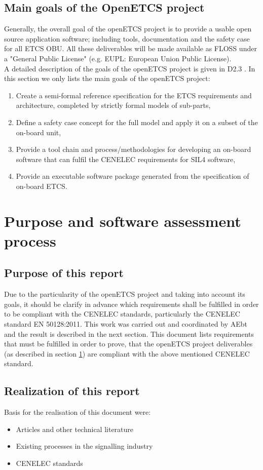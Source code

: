 \documentclass{template/openetcs_report}
\begin{document}
\section{Main goals of the OpenETCS project}
\label{goals}
Generally, the overall goal of the openETCS project is to provide a usable open source application software; including tools, documentation and the safety case for all ETCS OBU. All these deliverables will be made available as FLOSS under a "General Public License" (e.g. EUPL: European Union Public License).
\\
A detailed description of the goals of the openETCS project is given in D2.3 \cite{D23}. In this section we only lists the main goals of the openETCS project:
\begin{enumerate}
  \item Create a semi-formal reference specification for the ETCS requirements and architecture, completed by strictly formal models of sub-parts,
  \item Define a safety case concept for the full model and apply it on a subset of the on-board unit,  
  \item Provide a tool chain and process/methodologies for developing an on-board software that can fulfil the CENELEC requirements for SIL4 software,
  \item Provide an executable software package generated from the specification of on-board ETCS.
\end{enumerate}


\chapter{Purpose and software assessment process}
\section{Purpose of this report}
Due to the particularity of the openETCS project and taking into account its goals, it should
be clarify in advance which requirements shall be fulfilled in order to be compliant with the
CENELEC standards, particularly the CENELEC standard EN 50128:2011. This work was carried out and coordinated by AEbt and the result is described in the next section. 
This document lists requirements that must be fulfilled in order to prove, that the openETCS project deliverables (as described in section \ref{goals}) are compliant with the above mentioned CENELEC standard.

\section{Realization of this report}
\label{report}
Basis for the realisation of this document were:
\begin{itemize}
  \item Articles and other technical literature
  \item Existing processes in the signalling industry
  \item CENELEC standards
\end{itemize}
\end{document}
